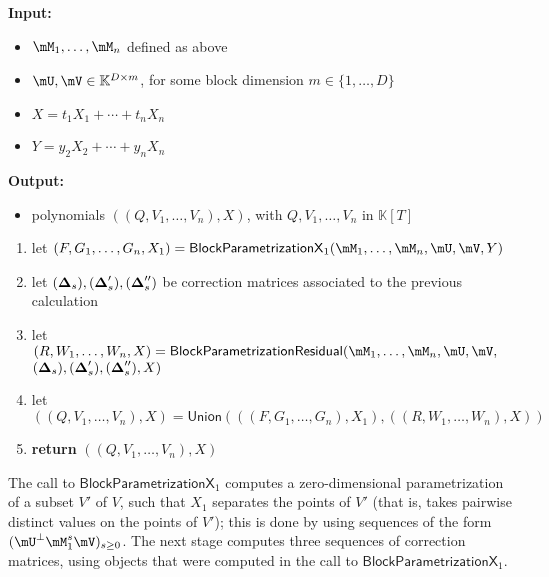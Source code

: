 \documentclass[12pt]{article}
\newcommand{\mat}[1]{\bm{\MakeUppercase{#1}}} %
\newcommand{\mainalgoname}{\mathsf{ BlockParametrization}}
\newcommand{\lf}{X}
\newcommand{\mf}{Y}
\newcommand{\sqfree}{Q}
\def\K{\mathbb{K}}
\def\K {\ensuremath{\mathbb{K}}}
\begin{document}
\begin{algorithm}[H]
  \caption{$\mathsf{BlockParametrizationWithSplitting}(\mM_1,\dots,\mM_n,\mU,\mV,\lf,\mf$)}
          {\bf Input:} \vspace{-0.5em}
	  \begin{itemize}
	  \item $\mM_1,\dots,\mM_n$ defined as above
	  \item  $\mU,\mV \in \mathbb{K}^{D \times m}$, for some block dimension  $m \in \{1,\dots,D\}$
          \item $\lf =t_1 X_1 + \cdots + t_n X_n$
          \item $\mf =y_2 X_2 + \cdots + y_n X_n$
	  \end{itemize}
	{\bf Output:}  \vspace{-0.5em}
	\begin{itemize}
		\item polynomials $((\sqfree,V_1,\dots,V_n),\lf)$, with $\sqfree,V_1,\dots,V_n$ in $\K[T]$
	\end{itemize}
	\begin{enumerate}
		\item let $(F,G_1,\dots,G_n,X_1)=\mathsf{BlockParametrizationX}_1(\mM_1,\dots,\mM_n,\mU,\mV,\mf)$
                \item let $(\mat{\Delta}_s),(\mat{\Delta}'_s),(\mat{\Delta}''_s)$ be correction matrices associated
                  to the previous calculation
		\item let $(R,W_1,\dots,W_n,\lf)=\mainalgoname{\sf Residual}(\mM_1,\dots,\mM_n,\mU,\mV,$ \\
      \phantom{bla} \hfill $(\mat{\Delta}_s),(\mat{\Delta}'_s),(\mat{\Delta}''_s),\lf)$
		\item let $((\sqfree,V_1,\dots,V_n),\lf)=\mathsf{Union}(((F,G_1,\dots,G_n),X_1), ((R,W_1,\dots,W_n),\lf))$
		\item \textbf{return} $((\sqfree,V_1,\dots,V_n),\lf)$
	\end{enumerate}
\end{algorithm}

The call to $\mathsf{BlockParametrizationX}_1$ computes a zero-dimensional
parametrization of a subset $V'$ of $V$, such that $X_1$ separates the
points of $V'$ (that is, takes pairwise distinct values on the points
of $V'$); this is done by using sequences of the form $(\mU^\perp
\mM_1^s \mV)_{s \ge 0}$. The next stage computes three 
sequences of correction matrices, using objects that were computed 
in the call to  $\mathsf{BlockParametrizationX}_1$.
\end{document}
